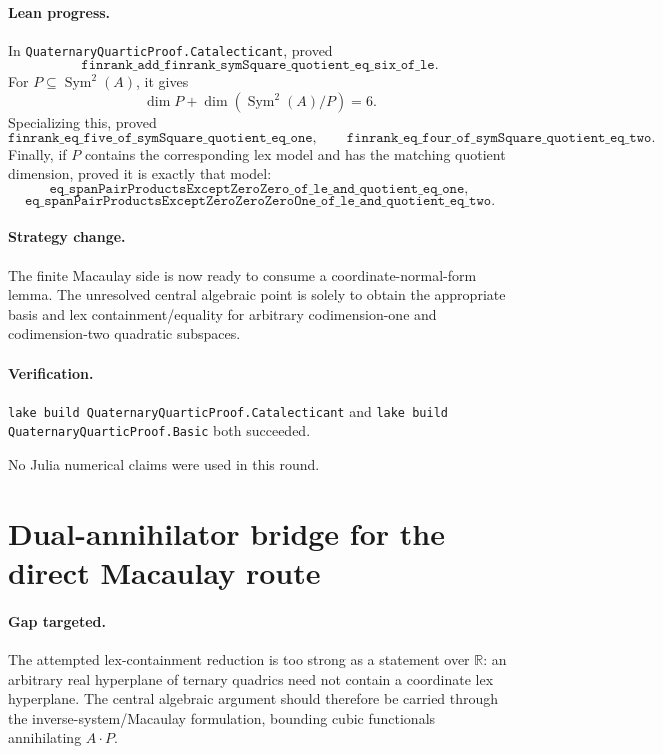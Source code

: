 \documentclass[11pt]{article}
\begin{document}
\paragraph{Lean progress.}
In \texttt{QuaternaryQuarticProof.Catalecticant}, proved
\[
\texttt{finrank\_add\_finrank\_symSquare\_quotient\_eq\_six\_of\_le}.
\]
For \(P\subseteq\operatorname{Sym}^2(A)\), it gives
\[
\dim P+\dim(\operatorname{Sym}^2(A)/P)=6.
\]
Specializing this, proved
\[
\texttt{finrank\_eq\_five\_of\_symSquare\_quotient\_eq\_one},
\qquad
\texttt{finrank\_eq\_four\_of\_symSquare\_quotient\_eq\_two}.
\]
Finally, if \(P\) contains the corresponding lex model and has the matching
quotient dimension, proved it is exactly that model:
\[
\texttt{eq\_spanPairProductsExceptZeroZero\_of\_le\_and\_quotient\_eq\_one},
\]
\[
\texttt{eq\_spanPairProductsExceptZeroZeroZeroOne\_of\_le\_and\_quotient\_eq\_two}.
\]

\paragraph{Strategy change.}
The finite Macaulay side is now ready to consume a coordinate-normal-form
lemma.  The unresolved central algebraic point is solely to obtain the
appropriate basis and lex containment/equality for arbitrary codimension-one
and codimension-two quadratic subspaces.

\paragraph{Verification.}
\texttt{lake build QuaternaryQuarticProof.Catalecticant} and
\texttt{lake build QuaternaryQuarticProof.Basic} both succeeded.

No Julia numerical claims were used in this round.

\section*{Dual-annihilator bridge for the direct Macaulay route}

\paragraph{Gap targeted.}
The attempted lex-containment reduction is too strong as a statement over
\(\mathbb{R}\): an arbitrary real hyperplane of ternary quadrics need not
contain a coordinate lex hyperplane.  The central algebraic argument should
therefore be carried through the inverse-system/Macaulay formulation, bounding
cubic functionals annihilating \(A\cdot P\).
\end{document}
